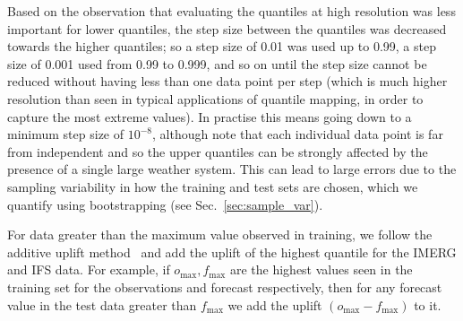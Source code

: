 \documentclass{article}
\begin{document}
Based on the observation that evaluating the quantiles at high resolution was less important for lower quantiles, the step size between the quantiles was decreased towards the higher quantiles; so a step size of 0.01 was used up to 0.99, a step size of 0.001 used from 0.99 to 0.999, and so on until the step size cannot be reduced without having less than one data point per step (which is much higher resolution than seen in typical applications of quantile mapping, in order to capture the most extreme values). In practise this means going down to a minimum step size of $10^{-8}$, although note that each individual data point is far from independent and so the upper quantiles can be strongly affected by the presence of a single large weather system. This can lead to large errors due to the sampling variability in how the training and test sets are chosen, which we quantify using bootstrapping (see Sec.~\ref{sec:sample_var}).



For data greater than the maximum value observed in training, we follow the additive uplift method~\citep{boe_statistical_2007, deque_frequency_2007} and add the uplift of the highest quantile for the IMERG and IFS data. For example, if $o_{\text{max}},f_{\text{max}}$ are the highest values seen in the training set for the observations and forecast respectively, then for any forecast value in the test data greater than $f_{\text{max}}$ we add the uplift $(o_{\text{max}} - f_{\text{max}})$ to it. 
\end{document}
